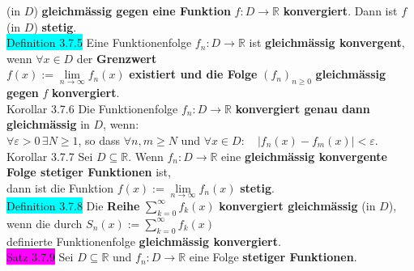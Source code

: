 \documentclass[10pt]{article}
\begin{document}
        \indent (in $D$) \textbf{gleichmässig gegen eine 
                Funktion} \textcolor{NavyBlue}{$f:D\longrightarrow\mathbb{R}$} 
                \textbf{konvergiert}. 
                Dann ist \textcolor{NavyBlue}{$f$} (in $D$) \textbf{stetig}.\\
\colorbox{cyan}{Definition 3.7.5} Eine Funktionenfolge 
                \textcolor{NavyBlue}{$f_n:D\longrightarrow\mathbb{R}$}
                ist \textbf{gleichmässig konvergent}, wenn 
                \textcolor{NavyBlue}{$\forall x\in D$} der 
                \textbf{Grenzwert} \\
        \indent \textcolor{NavyBlue}{$f(x):=\lim\limits_{n\to\infty}f_n(x)$}
                \textbf{existiert und die Folge}
                \textcolor{NavyBlue}{$(f_n)_{n\geqslant0}$} 
                \textbf{gleichmässig gegen} \textcolor{NavyBlue}{$f$} 
                \textbf{konvergiert}.\\
\colorbox{BurntOrange}{Korollar 3.7.6} Die Funktionenfolge 
        \textcolor{NavyBlue}{$f_n:D\longrightarrow\mathbb{R}$}
                \textbf{konvergiert genau dann gleichmässig} in $D$, wenn: \\
        \indent \textcolor{NavyBlue}{$\forall\varepsilon>0\,\exists N\geqslant1$}, so dass 
                \textcolor{NavyBlue}{$\forall n,m\geqslant N$} und 
                \textcolor{NavyBlue}{$\forall x\in D:\quad |f_n(x)-f_m(x)|<\varepsilon$}.\\
\colorbox{BurntOrange}{Korollar 3.7.7} Sei \textcolor{NavyBlue}{$D\subseteq\mathbb{R}$}. Wenn 
                \textcolor{NavyBlue}{$f_n:D\longrightarrow\mathbb{R}$} 
                eine \textbf{gleichmässig konvergente Folge stetiger Funktionen} ist, \\
        \indent dann ist die Funktion \textcolor{NavyBlue}{
                $f(x):=\lim\limits_{n\to\infty}f_n(x)$} \textbf{stetig}.\\
\colorbox{cyan}{Definition 3.7.8} Die \textbf{Reihe}
                \textcolor{NavyBlue}{$\sum_{k=0}^\infty f_k(x)$}
                \textbf{konvergiert gleichmässig} (in $D$), wenn die durch 
                \textcolor{NavyBlue}{$S_n(x):=\sum_{k=0}^\infty f_k(x)$} \\
        \indent definierte Funktionenfolge \textbf{gleichmässig konvergiert}.\\
\colorbox{magenta}{Satz 3.7.9} Sei \textcolor{NavyBlue}{$D\subseteq\mathbb{R}$} und 
                \textcolor{NavyBlue}{$f_n:D\longrightarrow\mathbb{R}$} 
                eine Folge \textbf{stetiger Funktionen}. 
\end{document}

